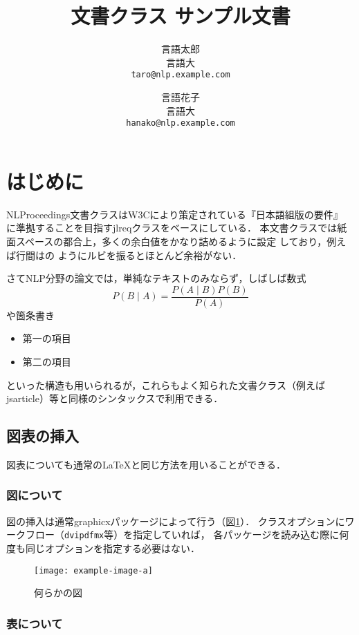\documentclass[
  platex, dvipdfmx,  %
]{rbproceedings}
\title{\pkg{NLProceedings}文書クラス サンプル文書}
\author{%
  言語太郎 \\ 言語大 \\ \texttt{taro@nlp.example.com}\and
  言語花子 \\ 言語大 \\ \texttt{hanako@nlp.example.com}}
\newcommand{\pkg}[1]{\textsf{#1}}
\newcommand{\code}[1]{\texttt{#1}}
\begin{document}
\maketitle

\section{はじめに}

\pkg{NLProceedings}文書クラスはW3Cにより策定されている『日本語組版の要件』%
\cite{JLREQ}に準拠することを目指す\pkg{jlreq}クラスをベースにしている．
本文書クラスでは紙面スペースの都合上，多くの余白値をかなり詰めるように設定
しており，例えば行間はの
ようにルビを振るとほとんど余裕がない．

さてNLP分野の論文では，単純なテキストのみならず，しばしば数式
%
\begin{equation}
P(B\mid A) = \frac{P(A\mid B)P(B)}{P(A)}
\end{equation}
%
や箇条書き
%
\begin{itemize}
\item 第一の項目
\item 第二の項目
\end{itemize}
%
といった構造も用いられるが，これらもよく知られた文書クラス（例えば
\pkg{jsarticle}）等と同様のシンタックスで利用できる．

\subsection{図表の挿入}

図表についても通常の\LaTeX と同じ方法を用いることができる．

\subsubsection{図について}

図の挿入は通常\pkg{graphicx}パッケージによって行う（図\ref{fig:sample}）．
クラスオプションにワークフロー（\code{dvipdfmx}等）を指定していれば，
各パッケージを読み込む際に何度も同じオプションを指定する必要はない．
%
\begin{figure}[h]
\centering
\texttt{[image: example-image-a]}
\caption{何らかの図}
\label{fig:sample}
\end{figure}

\subsubsection{表について}
\end{document}
